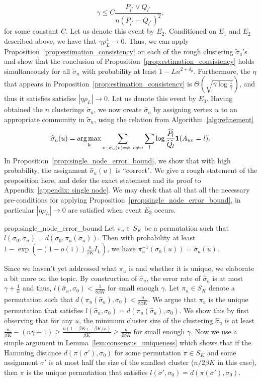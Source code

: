 \documentclass{article}
\begin{document}
\[
\gamma \leq  C\frac{ P_{l^*} \vee Q_{l^*}}{ n ( P_{l^*} - Q_{l^*} )^2}, 
\]
for some constant $C$. Let us denote this event by $E_2$. Conditioned on $E_1$ and $E_2$ described above, we have that $\gamma \rho_L^4 \rightarrow 0$. Thus, we can apply Proposition~\ref{prop:estimation_consistency} on each of the rough clustering $\tilde{\sigma}_u$'s and show that the conclusion of Proposition~\ref{prop:estimation_consistency} holds simultaneously for all $\tilde{\sigma}_u$ with probability at least $1 - Ln^{2 + \delta_p}$. Furthermore, the $\eta$ that appears in Proposition~\ref{prop:estimation_consistency} is $\Theta \left( \sqrt{\gamma \log \frac{1}{\gamma} } \right)$, and thus it satisfies satisfies $|\eta \rho_L| \rightarrow 0$. Let us denote this event by $E_3$. Having obtained the $n$ clusterings $\tilde \sigma_u$, we now create $\hat \sigma_u$ by assigning vertex $u$ to an appropriate community in $\tilde \sigma_u$, using the relation from Algorithm~\ref{alg:refinement}
 \[
    \widehat{\sigma}_u(u) = \mathop{\text{\rm arg\,max}}_k \sum_{v \,:\, \widetilde{\sigma}_u(v) = k ,\, v\neq u} 
         \sum_l \log \frac{\widehat{P}_l}{\widehat{Q}_l} \mbox{\boldmath $1$}(A_{uv} = l). 
\]    
In Proposition~\ref{prop:single_node_error_bound}, we show that with high probability, the assignment $\hat \sigma_u(u)$ is ``correct". We give a rough statement of  the proposition here, and defer the exact statement and its proof to Appendix~\ref{appendix: single node}. We may check that all that all the necessary pre-conditions for applying Proposition~\ref{prop:single_node_error_bound}, in particular $|\eta \rho_L| \to 0$ are satisfied when event $E_3$ occurs.
\begin{repproposition}{prop:single_node_error_bound}
Let $\pi_u \in S_K$ be a permutation such that $l(\sigma_0, \tilde \sigma_u) = d(\sigma_0, \pi_u(\tilde \sigma_u)).$ Then with probability at least $1 - \exp \left( - (1 - o(1)) \frac{n}{\beta K} I_L \right)$, we have $\pi_u^{-1}(\sigma_0(u)) = \hat \sigma_u(u).$
\end{repproposition}
Since we haven't yet addressed what $\pi_u$ is and whether it is unique, we elaborate a bit more on the topic. By construction of $\hat{\sigma}_u$, the error rate of $\hat{\sigma}_u$ is at most $ \gamma + \frac{1}{n}$ and thus, $l(\hat{\sigma}_u, \sigma_0) < \frac{1}{8 \beta K}$ for small enough $\gamma$. Let $\pi_u \in S_K$ denote a permutation such that $d(\pi_u(\hat{\sigma}_u), \sigma_0) < \frac{n}{8\beta K}$. We argue that $\pi_u$ is the unique permutation that satisfies $l(\hat \sigma_u, \sigma_0) = d(\pi_u(\hat{\sigma}_u), \sigma_0)$. We show this by first observing that for any $u$, the minimum cluster size of the clustering $\hat{\sigma}_u$ is at least $\frac{n}{\beta K} - (n \gamma + 1) \geq \frac{ n(1 - \beta K \gamma  - \beta K/n)}{\beta K} \geq \frac{n}{2\beta K}$ for small enough $\gamma$. Now we use a simple argument in  Lemma~\ref{lem:consensus_uniqueness} which shows that if the Hamming distance $d(\pi(\sigma'), \sigma_0)$ for some permutation $\pi \in S_K$ and some assignment $\sigma'$ is at most half the size of the smallest cluster ($n/2\beta K$ in this case), then $\pi$ is the unique permutation that satisfies $l(\sigma', \sigma_0) = d(\pi(\sigma'), \sigma_0)$. 
\end{document}
